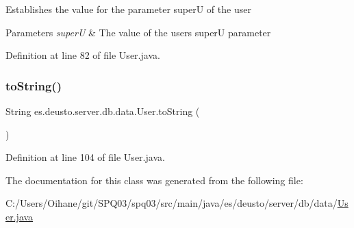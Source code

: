 Establishes the value for the parameter superU of the user 
\begin{DoxyParams}{Parameters}
{\em superU} & The value of the users superU parameter \\
\hline
\end{DoxyParams}


Definition at line 82 of file User.\+java.

\mbox{\label{classes_1_1deusto_1_1server_1_1db_1_1data_1_1_user_a494980951c4c71c0a793994b7bcd5101}} 
\subsubsection{\texorpdfstring{to\+String()}{toString()}}
{\footnotesize\ttfamily String es.\+deusto.\+server.\+db.\+data.\+User.\+to\+String (\begin{DoxyParamCaption}{ }\end{DoxyParamCaption})}



Definition at line 104 of file User.\+java.



The documentation for this class was generated from the following file\+:\begin{DoxyCompactItemize}
\item 
C\+:/\+Users/\+Oihane/git/\+S\+P\+Q03/spq03/src/main/java/es/deusto/server/db/data/\hyperlink{_user_8java}{User.\+java}\end{DoxyCompactItemize}
